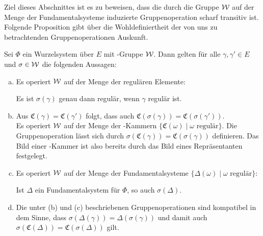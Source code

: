 Ziel dieses Abschnittes ist es zu beweisen, dass die durch die Gruppe $\mathcal{W}$ auf der Menge der Fundamentalsysteme induzierte Gruppenoperation scharf transitiv ist.
Folgende Proposition gibt über die Wohldefiniertheit der von uns zu betrachtenden Gruppenoperationen Auskunft.

\begin{prop}
  \label{prop:groupOp}
  Sei $\Phi$ ein Wurzelsystem über $E$ mit \weyl\hyp{}Gruppe $\mathcal{W}$.
  Dann gelten für alle $\gamma, \gamma' \in E$ und $\sigma \in \mathcal{W}$ die folgenden Aussagen:
  \begin{enumerate}[(a)]
    \item Es operiert $\mathcal{W}$ auf der Menge der regulären Elemente: 
      \begin{addmargin}[2em]{2em}
        Es ist $\sigma(\gamma)$ genau dann regulär, wenn $\gamma$ regulär ist.
      \end{addmargin}
      
    \item Aus $\mathfrak{C}(\gamma) = \mathfrak{C}(\gamma')$ folgt, dass auch $\mathfrak{C}(\sigma(\gamma)) = \mathfrak{C}(\sigma(\gamma'))$. \\
      Es operiert $\mathcal{W}$ auf der Menge der \weyl\hyp{}Kammern $\{\mathfrak{C}(\omega) \mid \omega \text{ regulär}\}$. 
      Die Gruppenoperation lässt sich durch $ \sigma(\mathfrak{C}(\gamma)) = \mathfrak{C}(\sigma(\gamma))$ definieren.
      Das Bild einer \weyl\hyp{}Kammer ist also bereits durch das Bild eines Repräsentanten festgelegt.

    \item Es operiert $\mathcal{W}$ auf der Menge der Fundamentalsysteme $\{\Delta(\omega) \mid \omega \text{ regulär}\}$: 
      \begin{addmargin}[2em]{2em}
        Ist $\Delta$ ein Fundamentalsystem für $\Phi$, so auch $\sigma(\Delta)$. 
      \end{addmargin}

    \item Die unter (b) und (c) beschriebenen Gruppenoperationen sind kompatibel in dem Sinne, dass 
      $\sigma(\Delta(\gamma)) = \Delta(\sigma(\gamma))$
      und damit auch
      $\sigma(\mathfrak{C}(\Delta)) = \mathfrak{C}(\sigma(\Delta))$
      gilt.
  \end{enumerate}
\end{prop}

